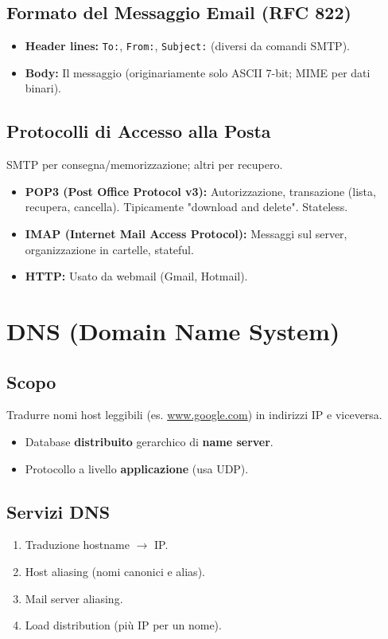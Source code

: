 \subsection{Formato del Messaggio Email (RFC 822)}
\begin{itemize}
    \item \textbf{Header lines:} \texttt{To:}, \texttt{From:}, \texttt{Subject:} (diversi da comandi SMTP).
    \item \textbf{Body:} Il messaggio (originariamente solo ASCII 7-bit; MIME per dati binari).
\end{itemize}

\subsection{Protocolli di Accesso alla Posta}
SMTP per consegna/memorizzazione; altri per recupero.
\begin{itemize}
    \item \textbf{POP3 (Post Office Protocol v3):} Autorizzazione, transazione (lista, recupera, cancella). Tipicamente "download and delete". Stateless.
    \item \textbf{IMAP (Internet Mail Access Protocol):} Messaggi sul server, organizzazione in cartelle, stateful.
    \item \textbf{HTTP:} Usato da webmail (Gmail, Hotmail).
\end{itemize}


\section{DNS (Domain Name System)}
\subsection{Scopo}
Tradurre nomi host leggibili (es. \url{www.google.com}) in indirizzi IP e viceversa.
\begin{itemize}
    \item Database \textbf{distribuito} gerarchico di \textbf{name server}.
    \item Protocollo a livello \textbf{applicazione} (usa UDP).
\end{itemize}

\subsection{Servizi DNS}
\begin{enumerate}
    \item Traduzione hostname $\rightarrow$ IP.
    \item Host aliasing (nomi canonici e alias).
    \item Mail server aliasing.
    \item Load distribution (più IP per un nome).
\end{enumerate}

